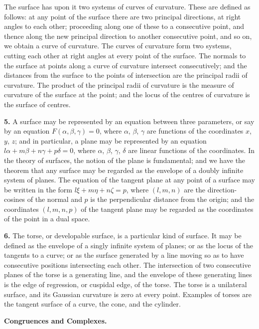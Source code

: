 \documentclass[11pt,a4paper]{book}
\begin{document}
The surface has upon it two systems of curves of curvature. These are defined as follows: at any point of the surface there are two principal directions, at right angles to each other; proceeding along one of these to a consecutive point, and thence along the new principal direction to another consecutive point, and so on, we obtain a curve of curvature. The curves of curvature form two systems, cutting each other at right angles at every point of the surface. The normals to the surface at points along a curve of curvature intersect consecutively; and the distances from the surface to the points of intersection are the principal radii of curvature. The product of the principal radii of curvature is the measure of curvature of the surface at the point; and the locus of the centres of curvature is the surface of centres.

\textbf{5.}\quad
A surface may be represented by an equation between three parameters, or say by an equation $F(\alpha, \beta, \gamma) = 0$, where $\alpha$, $\beta$, $\gamma$ are functions of the coordinates $x$, $y$, $z$; and in particular, a plane may be represented by an equation $l\alpha + m\beta + n\gamma + p\delta = 0$, where $\alpha$, $\beta$, $\gamma$, $\delta$ are linear functions of the coordinates. In the theory of surfaces, the notion of the plane is fundamental; and we have the theorem that any surface may be regarded as the envelope of a doubly infinite system of planes. The equation of the tangent plane at any point of a surface may be written in the form $l\xi + m\eta + n\zeta = p$, where $(l, m, n)$ are the direction-cosines of the normal and $p$ is the perpendicular distance from the origin; and the coordinates $(l, m, n, p)$ of the tangent plane may be regarded as the coordinates of the point in a dual space.

\textbf{6.}\quad
The torse, or developable surface, is a particular kind of surface. It may be defined as the envelope of a singly infinite system of planes; or as the locus of the tangents to a curve; or as the surface generated by a line moving so as to have consecutive positions intersecting each other. The intersection of two consecutive planes of the torse is a generating line, and the envelope of these generating lines is the edge of regression, or cuspidal edge, of the torse. The torse is a unilateral surface, and its Gaussian curvature is zero at every point. Examples of torses are the tangent surface of a curve, the cone, and the cylinder.

\bigskip
\noindent\textbf{Congruences and Complexes.}
\end{document}
